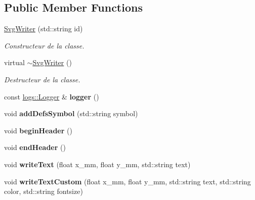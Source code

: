 \subsection*{Public Member Functions}
\begin{DoxyCompactItemize}
\item 
\hyperlink{classSvgWriter_a30059a7d7289c57d3bf1bf623713dc0a}{Svg\+Writer} (std\+::string id)
\begin{DoxyCompactList}\small\item\em Constructeur de la classe. \end{DoxyCompactList}\item 
\mbox{\label{classSvgWriter_ae9f503ecbe84f673f7f05dc50a52728d}} 
virtual \hyperlink{classSvgWriter_ae9f503ecbe84f673f7f05dc50a52728d}{$\sim$\+Svg\+Writer} ()
\begin{DoxyCompactList}\small\item\em Destructeur de la classe. \end{DoxyCompactList}\item 
\mbox{\label{classSvgWriter_a0a4640b661160b29d991116a197f7aaf}} 
const \hyperlink{classlogs_1_1Logger}{logs\+::\+Logger} \& {\bfseries logger} ()
\item 
\mbox{\label{classSvgWriter_a9fbe18d7bc202481f93b87a1b3a9077e}} 
void {\bfseries add\+Defs\+Symbol} (std\+::string symbol)
\item 
\mbox{\label{classSvgWriter_ac6b52164bb48debc2aa814b2e96ec233}} 
void {\bfseries begin\+Header} ()
\item 
\mbox{\label{classSvgWriter_a18e6747b544e14bc12f184bce594ec63}} 
void {\bfseries end\+Header} ()
\item 
\mbox{\label{classSvgWriter_a1860768b0bf4858dae8577f2b7653cac}} 
void {\bfseries write\+Text} (float x\+\_\+mm, float y\+\_\+mm, std\+::string text)
\item 
\mbox{\label{classSvgWriter_ae4246028907242734cc14db98d492eb5}} 
void {\bfseries write\+Text\+Custom} (float x\+\_\+mm, float y\+\_\+mm, std\+::string text, std\+::string color, std\+::string fontsize)
\item 

\end{DoxyCompactItemize}
